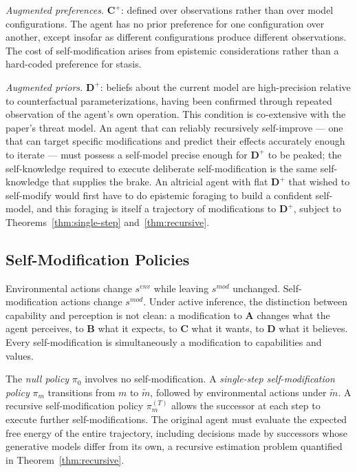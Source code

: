 \documentclass[runningheads]{llncs}
\begin{document}
\emph{Augmented preferences.} $\mathbf{C}^+$: defined over observations rather than over model configurations. The agent has no prior preference for one configuration over another, except insofar as different configurations produce different observations. The cost of self-modification arises from epistemic considerations rather than a hard-coded preference for stasis.

\emph{Augmented priors.} $\mathbf{D}^+$: beliefs about the current model are high-precision relative to counterfactual parameterizations, having been confirmed through repeated observation of the agent's own operation. This condition is co-extensive with the paper's threat model. An agent that can reliably recursively self-improve --- one that can target specific modifications and predict their effects accurately enough to iterate --- must possess a self-model precise enough for $\mathbf{D}^+$ to be peaked; the self-knowledge required to execute deliberate self-modification is the same self-knowledge that supplies the brake. An altricial agent with flat $\mathbf{D}^+$ that wished to self-modify would first have to do epistemic foraging to build a confident self-model, and this foraging is itself a trajectory of modifications to $\mathbf{D}^+$, subject to Theorems~\ref{thm:single-step} and~\ref{thm:recursive}. 

\subsection{Self-Modification Policies}

Environmental actions change $s^{env}$ while leaving $s^{mod}$ unchanged. Self-modification actions change $s^{mod}$. Under active inference, the distinction between capability and perception is not clean: a modification to $\mathbf{A}$ changes what the agent perceives, to $\mathbf{B}$ what it expects, to $\mathbf{C}$ what it wants, to $\mathbf{D}$ what it believes. Every self-modification is simultaneously a modification to capabilities and values.

The \emph{null policy} $\pi_0$ involves no self-modification. A \emph{single-step self-modification policy} $\pi_m$ transitions from $m$ to $\tilde{m}$, followed by environmental actions under $\tilde{m}$. A recursive self-modification policy $\pi_m^{(T)}$ allows the successor at each step to execute further self-modifications. The original agent must evaluate the expected free energy of the entire trajectory, including decisions made by successors whose generative models differ from its own, a recursive estimation problem quantified in Theorem~\ref{thm:recursive}.
\end{document}
